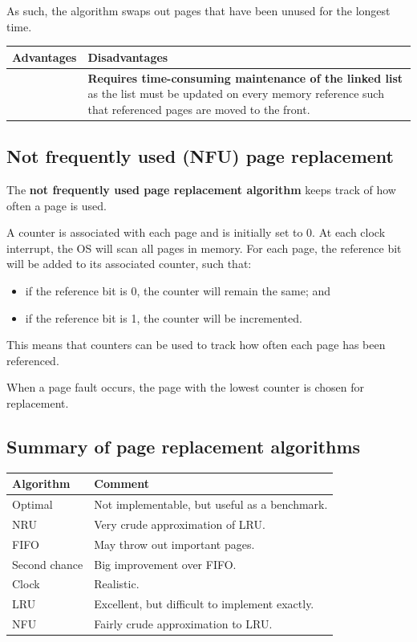 \documentclass[a4paper]{systems-software}
\begin{document}
As such, the algorithm swaps out pages that have been unused for the longest time.

\begin{longtabu} to \textwidth {| X[1,l] | X[1,l] |}
    \hline
    \textbf{Advantages} & \textbf{Disadvantages}
	\\ \hline
	& \textbf{Requires time-consuming maintenance of the linked list} as the list must be updated on every memory reference such that referenced pages are moved to the front.
	\\ \hline
\end{longtabu}


\subsection*{Not frequently used (NFU) page replacement}

The \textbf{not frequently used page replacement algorithm} keeps track of how often a page is used.

A counter is associated with each page and is initially set to 0. At each clock interrupt, the OS will scan all pages in memory. For each page, the reference bit will be added to its associated counter, such that:
\begin{itemize}
	\item if the reference bit is 0, the counter will remain the same; and
	\item if the reference bit is 1, the counter will be incremented.
\end{itemize}

This means that counters can be used to track how often each page has been referenced.

When a page fault occurs, the page with the lowest counter is chosen for replacement.


\subsection*{Summary of page replacement algorithms}

\begin{longtabu} to \textwidth {| X[0.25,l] | X[1,l] |}
    \hline
    \textbf{Algorithm} & \textbf{Comment}
	\\ \hline
	Optimal & Not implementable, but useful as a benchmark.
	\\ \hline
	NRU & Very crude approximation of LRU.
	\\ \hline
	FIFO & May throw out important pages.
	\\ \hline
	Second chance & Big improvement over FIFO.
	\\ \hline
	Clock & Realistic.
	\\ \hline
	LRU & Excellent, but difficult to implement exactly.
	\\ \hline
	NFU & Fairly crude approximation to LRU.
	\\ \hline
\end{longtabu}
\end{document}
